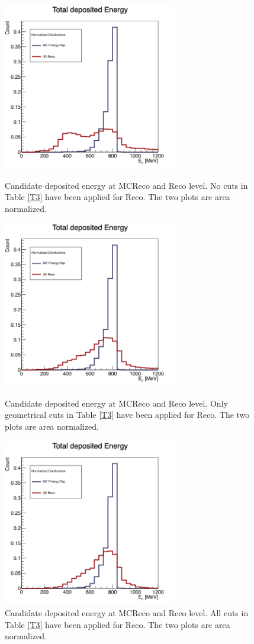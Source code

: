 \documentclass[a4paper, 10pt]{article}
\begin{document}
\begin{figure}[hpbt]
\centering
\begin{minipage}{0.45\textwidth}
\centering
\includegraphics[width=3in]{pMuGamma/ProtonSameNoCut.png}
\caption{Candidate deposited energy at MCReco and Reco level. No cuts in Table \ref{T3} have been applied for Reco. The two plots are area normalized.}
\label{F6}
\end{minipage}\hfill
\begin{minipage}{0.45\textwidth}
\centering
\includegraphics[width=3in]{pMuGamma/ProtonSameGeo.png}
\caption{Candidate deposited energy at MCReco and Reco level. Only geometrical cuts in Table \ref{T3} have been applied for Reco. The two plots are area normalized.}
\label{F7}
\end{minipage}\hfill
\begin{minipage}{0.45\textwidth}
\centering
\includegraphics[width=3in]{pMuGamma/ProtonSameGeoAndEn.png}
\caption{Candidate deposited energy at MCReco and Reco level. All cuts in Table \ref{T3} have been applied for Reco. The two plots are area normalized.}
\label{F8}
\end{minipage}
\end{figure}
\end{document}

